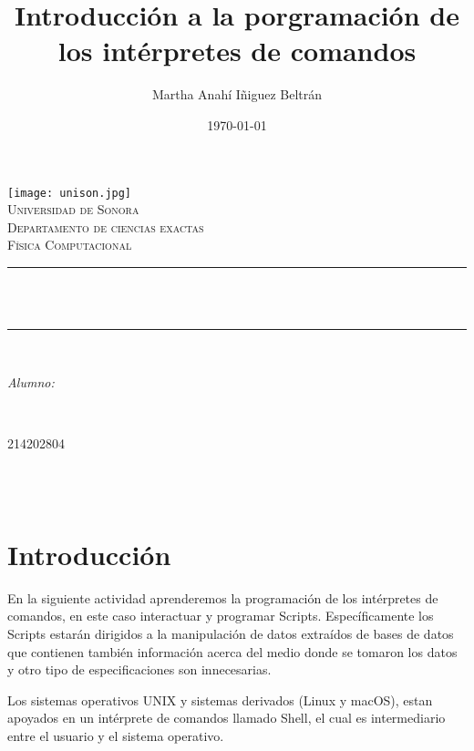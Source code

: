 \documentclass[12pt]{article}
\title{Introducción a la porgramación de los intérpretes de comandos}								%
\author{Martha Anahí Iñiguez Beltrán}						%
\date{\today}											%
\makeatletter
\let\thetitle\@title
\let\theauthor\@author
\let\thedate\@date
\makeatother
\begin{document}
\begin{titlepage}
\centering
    \vspace*{0.5 cm}
    \texttt{[image: unison.jpg]}\\[1.0 cm]	%
    \textsc{\LARGE Universidad de Sonora}\\[2.0 cm]	%
    \textsc{\Large Departamento de ciencias exactas}\\[1.0 cm]
\textsc{\Large Física Computacional}\\[0.5 cm]
\rule{\linewidth}{0.2 mm} \\[0.4 cm]
{ \huge \bfseries \thetitle}\\
\rule{\linewidth}{0.2 mm} \\[1.5 cm]
\begin{minipage}{0.6\textwidth}
\begin{flushleft} \large
\emph{Alumno:}\\
\theauthor
\end{flushleft}
\end{minipage}~
\begin{minipage}{0.4\textwidth}
\begin{flushright} \large
214202804
\end{flushright}
\end{minipage}\\[2 cm]


{\large \thedate}\\[2 cm]

\vfill

\end{titlepage}

\tableofcontents
\pagebreak

\section{Introducción}

En la siguiente actividad aprenderemos la programación de los intérpretes de comandos, en este caso interactuar y programar Scripts. Específicamente los Scripts estarán dirigidos a la manipulación de datos extraídos de bases de datos que contienen también información acerca del medio donde se tomaron los datos y otro tipo de especificaciones son innecesarias.

Los sistemas operativos UNIX y sistemas derivados (Linux y macOS), estan apoyados en un intérprete de comandos llamado Shell, el cual es intermediario entre el usuario y el sistema operativo.
\end{document}

